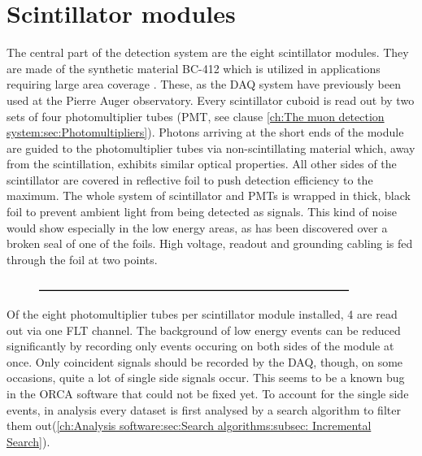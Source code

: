   \section{Scintillator modules}
  \label{ch:The muon detection system:sec:Scintillator modules}
  The central part of the detection system are the eight scintillator modules. They are made of the synthetic material BC-412 which is utilized in applications requiring large area coverage \cite{scintillatorManual}. These, as the DAQ system have previously been used at the Pierre Auger observatory. Every scintillator cuboid is read out by two sets of four photomultiplier tubes (PMT, see clause \ref{ch:The muon detection system:sec:Photomultipliers}). Photons arriving at the short ends of the module are guided to the photomultiplier tubes via non-scintillating material which, away from the scintillation, exhibits similar optical properties. All other sides of the scintillator are covered in reflective foil to push detection efficiency to the maximum. The whole system of scintillator and PMTs is wrapped in thick, black foil to prevent ambient light from being detected as signals. This kind of noise would show especially in the low energy areas, as has been discovered over a broken seal of one of the foils. High voltage, readout and grounding cabling is fed through the foil at two points.
  \begin{figure}
    \centering
    \includegraphics[width = 0.9\textwidth]{graphics/dummy.eps}	
  \end{figure}
  Of the eight photomultiplier tubes per scintillator module installed, 4 are read out via one FLT channel. The background of low energy events can be reduced significantly by recording only events occuring on both sides of the module at once. Only coincident signals should be recorded by the DAQ, though, on some occasions, quite a lot of single side signals occur. This seems to be a known bug in the ORCA software that could not be fixed yet. To account for the single side events, in analysis every dataset is first analysed by a search algorithm to filter them out(\ref{ch:Analysis software:sec:Search algorithms:subsec: Incremental Search}).
  

  
  
